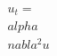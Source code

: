\documentclass[preview]{standalone}
\begin{document}
\begin{align*}
u_t = \\alpha \\nabla^2 u
\end{align*}
\end{document}
